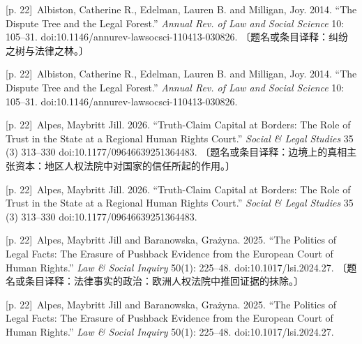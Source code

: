 \documentclass[10pt,a4paper]{article}
\begin{document}
\noindent\begin{minipage}{\textwidth}\begin{minipage}[t]{\dimexpr.5\textwidth-4mm\relax}{\scriptsize\color{gray} [p. 22]}\ Albiston, Catherine R., Edelman, Lauren B. and Milligan, Joy. 2014. “The Dispute Tree and the Legal Forest.” \textit{Annual Rev. of Law and Social Science} 10: 105–31. doi:10.1146/annurev-lawsocsci-110413-030826. 〔题名或条目译释：纠纷之树与法律之林。〕\par\end{minipage}\hfill\begin{minipage}[t]{\dimexpr.5\textwidth-4mm\relax}{\scriptsize\color{gray} [p. 22]}\ Albiston, Catherine R., Edelman, Lauren B. and Milligan, Joy. 2014. “The Dispute Tree and the Legal Forest.” \textit{Annual Rev. of Law and Social Science} 10: 105–31. doi:10.1146/annurev-lawsocsci-110413-030826.\par\end{minipage}\end{minipage}\par
\noindent\begin{minipage}{\textwidth}\begin{minipage}[t]{\dimexpr.5\textwidth-4mm\relax}{\scriptsize\color{gray} [p. 22]}\ Alpes, Maybritt Jill. 2026. “Truth-Claim Capital at Borders: The Role of Trust in the State at a Regional Human Rights Court.” \textit{Social \& Legal Studies} 35 (3) 313–330 doi:10.1177/09646639251364483. 〔题名或条目译释：边境上的真相主张资本：地区人权法院中对国家的信任所起的作用。〕\par\end{minipage}\hfill\begin{minipage}[t]{\dimexpr.5\textwidth-4mm\relax}{\scriptsize\color{gray} [p. 22]}\ Alpes, Maybritt Jill. 2026. “Truth-Claim Capital at Borders: The Role of Trust in the State at a Regional Human Rights Court.” \textit{Social \& Legal Studies} 35 (3) 313–330 doi:10.1177/09646639251364483.\par\end{minipage}\end{minipage}\par
\noindent\begin{minipage}{\textwidth}\begin{minipage}[t]{\dimexpr.5\textwidth-4mm\relax}{\scriptsize\color{gray} [p. 22]}\ Alpes, Maybritt Jill and Baranowska, Grażyna. 2025. “The Politics of Legal Facts: The Erasure of Pushback Evidence from the European Court of Human Rights.” \textit{Law \& Social Inquiry} 50(1): 225–48. doi:10.1017/lsi.2024.27. 〔题名或条目译释：法律事实的政治：欧洲人权法院中推回证据的抹除。〕\par\end{minipage}\hfill\begin{minipage}[t]{\dimexpr.5\textwidth-4mm\relax}{\scriptsize\color{gray} [p. 22]}\ Alpes, Maybritt Jill and Baranowska, Grażyna. 2025. “The Politics of Legal Facts: The Erasure of Pushback Evidence from the European Court of Human Rights.” \textit{Law \& Social Inquiry} 50(1): 225–48. doi:10.1017/lsi.2024.27.\par\end{minipage}\end{minipage}\par
\end{document}
